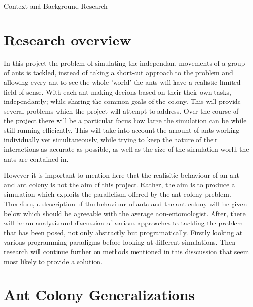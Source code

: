\documentclass[main.tex]{subfiles}
\begin{document}
Context and Background Research

\section{Research overview} %
In this project the problem of simulating the independant movements of a group of ants is tackled, instead of taking a short-cut approach to the problem and allowing every ant to see the whole 'world' the ants will have a realistic limited field of sense. With each ant making decions based on their their own tasks, independantly; while sharing the common goals of the colony. This will provide several problems which the project will attempt to address. Over the course of the project there will be a particular focus how large the simulation can be while still running efficiently. This will take into account the amount of ants working individually yet simultaneously, while trying to keep the nature of their interactions as accurate as possible, as well as the size of the simulation world the ants are contained in.

However it is important to mention here that the realisitic behaviour of an ant and ant colony is not the aim of this project. Rather, the aim is to produce a simulation which exploits the parallelism offered by the ant colony problem. Therefore, a description of the behaviour of ants and the ant colony will be given below which should be agreeable with the average non-entomologist. After, there will be an analysis and discussion of various approaches to tackling the problem that has been posed, not only abstractly but programatically. Firstly looking at various programming paradigms before looking at different simulations. Then research will continue further on methods mentioned in this disscussion that seem most likely to provide a solution. 

\section{Ant Colony Generalizations} %
\end{document}
